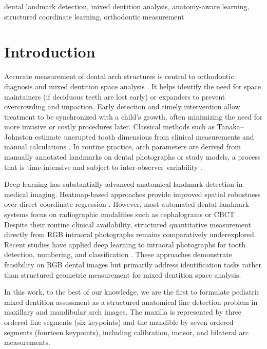 \documentclass[conference]{IEEEtran}
\begin{document}
\begin{IEEEkeywords}
dental landmark detection, mixed dentition analysis, anatomy-aware learning,
structured coordinate learning, orthodontic measurement
\end{IEEEkeywords}

\section{Introduction}

Accurate measurement of dental arch structures is central to orthodontic diagnosis and mixed
dentition space analysis \cite{moyers1988handbook}. It helps identify the need for space
maintainers (if deciduous teeth are lost early) or expanders to prevent overcrowding and
impaction. Early detection and timely intervention allow treatment to be synchronized with a
child's growth, often minimizing the need for more invasive or costly procedures later.
Classical methods such as Tanaka--Johnston estimate unerupted tooth dimensions from clinical
measurements and manual calculations \cite{tanaka1974prediction}. In routine practice, arch
parameters are derived from manually annotated landmarks on dental photographs or study models,
a process that is time-intensive and subject to inter-observer variability
\cite{schwendicke2020artificial}.

Deep learning has substantially advanced anatomical landmark detection in medical imaging.
Heatmap-based approaches provide improved spatial robustness over direct coordinate regression
\cite{newell2016stacked,payer2016regressing}. However, most automated dental landmark systems
focus on radiographic modalities such as cephalograms or CBCT
\cite{wang2016benchmark,schwendicke2019deep}. Despite their routine clinical availability,
structured quantitative measurement directly from RGB intraoral photographs remains
comparatively underexplored. Recent studies have applied deep learning to intraoral photographs
for tooth detection, numbering, and classification
\cite{ghorbani2025automated,kartbak2025classification,koch2026angleclassification}. These
approaches demonstrate feasibility on RGB dental images but primarily address identification
tasks rather than structured geometric measurement for mixed dentition space analysis.

In this work, to the best of our knowledge, we are the first to formulate pediatric mixed
dentition assessment as a structured anatomical line detection problem in maxillary and
mandibular arch images. The maxilla is represented by three ordered line segments (six
keypoints) and the mandible by seven ordered segments (fourteen keypoints), including
calibration, incisor, and bilateral arc measurements.
\end{document}
